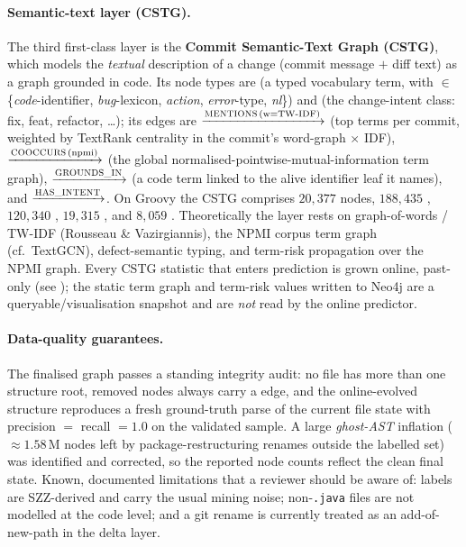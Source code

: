 	\paragraph{Semantic-text layer (CSTG).} The third first-class layer is the
	\textbf{Commit Semantic-Text Graph (CSTG)}, which models the \emph{textual}
	description of a change (commit message $+$ diff text) as a graph grounded in code.
	Its node types are  (a typed vocabulary term, with  $\in$
	\{\emph{code}-identifier, \emph{bug}-lexicon, \emph{action}, \emph{error}-type,
	\emph{nl}\}) and  (the change-intent class: fix, feat, refactor, \dots);
	its edges are
	$\xrightarrow{\text{\textsc{MENTIONS}\,(w=\text{TW-IDF})}}$ (top
	terms per commit, weighted by TextRank centrality in the commit's word-graph $\times$
	IDF), $\xrightarrow{\text{\textsc{COOCCURS}\,(\text{npmi})}}$ (the
	global normalised-pointwise-mutual-information term graph),
	$\xrightarrow{\text{\textsc{GROUNDS\_IN}}}$ (a code term linked
	to the alive identifier leaf it names), and
	$\xrightarrow{\text{\textsc{HAS\_INTENT}}}$. On Groovy the CSTG
	comprises $20{,}377$  nodes, $188{,}435$ , $120{,}340$
	, $19{,}315$ , and $8{,}059$ .
	Theoretically the layer rests on graph-of-words / TW-IDF (Rousseau \& Vazirgiannis),
	the NPMI corpus term graph (cf.\ TextGCN), defect-semantic typing, and term-risk
	propagation over the NPMI graph. Every CSTG statistic that enters prediction is grown
	online, past-only (see ); the static term graph and
	term-risk values written to Neo4j are a queryable/visualisation snapshot and are
	\emph{not} read by the online predictor.
	
	\paragraph{Data-quality guarantees.} The finalised graph passes a standing integrity
	audit: no file has more than one structure root, removed nodes always carry a
	 edge, and the online-evolved structure reproduces a fresh
	ground-truth parse of the current file state with precision $=$ recall $=1.0$ on the
	validated sample. A large \emph{ghost-AST} inflation ($\approx\!1.58$\,M nodes left by
	package-restructuring renames outside the labelled set) was identified and corrected,
	so the reported node counts reflect the clean final state. Known, documented
	limitations that a reviewer should be aware of: labels are SZZ-derived and carry the
	usual mining noise; non-\texttt{.java} files are not modelled at the code level; and
	a git rename is currently treated as an add-of-new-path in the delta layer.
	
